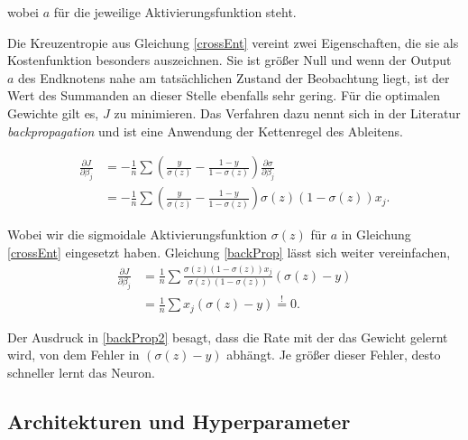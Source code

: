 \documentclass{article}
\begin{document}
wobei $a$ f{\"u}r die jeweilige Aktivierungsfunktion steht.

Die Kreuzentropie aus Gleichung \ref{crossEnt} vereint zwei Eigenschaften, die sie als Kostenfunktion besonders auszeichnen. Sie ist gr{\"o}{\ss}er Null und wenn der Output $a$ des Endknotens nahe am tats{\"a}chlichen Zustand der Beobachtung liegt, ist der Wert des Summanden an dieser Stelle ebenfalls sehr gering. F{\"u}r die optimalen Gewichte gilt es, $J$ zu minimieren. Das Verfahren dazu nennt sich in der Literatur \textit{backpropagation} und ist eine Anwendung der Kettenregel des Ableitens.

\begin{equation}
\label{backProp}
\begin{split}
\frac{\partial J}{\partial \beta_j} &= - \frac{1}{n}\sum \left( \frac{y}{\sigma (z)} - \frac{1-y}{1-\sigma(z)}
                                      \right) \frac{\partial \sigma}{\partial \beta_j} \\
                                    &= - \frac{1}{n}\sum \left( \frac{y}{\sigma (z)} - \frac{1-y}{1-\sigma(z)}
                                      \right) \sigma(z) \left( 1- \sigma(z) \right) x_j .
\end{split}
\end{equation}

Wobei wir die sigmoidale Aktivierungsfunktion $\sigma(z)$ f{\"u}r $a$ in Gleichung \ref{crossEnt} eingesetzt haben. Gleichung \ref{backProp} l{\"a}sst sich weiter vereinfachen,
\begin{equation}
\label{backProp2}
\begin{split}
\frac{\partial J}{\partial \beta_j} &= \frac{1}{n} \sum \frac{\sigma(z) \left( 1- \sigma(z)\right) x_j}{\sigma(z) \left( 1- \sigma(z) \right)} \left( \sigma(z) - y \right) \\
                                    &= \frac{1}{n} \sum x_j \left( \sigma(z) - y \right) \stackrel{!}{=} 0 .
\end{split}
\end{equation}

Der Ausdruck in \ref{backProp2} besagt, dass die Rate mit der das Gewicht gelernt wird, von dem Fehler in $\left( \sigma(z) - y \right)$ abh{\"a}ngt. Je gr{\"o}{\ss}er dieser Fehler, desto schneller lernt das Neuron.



\subsection{Architekturen und Hyperparameter}
\end{document}
